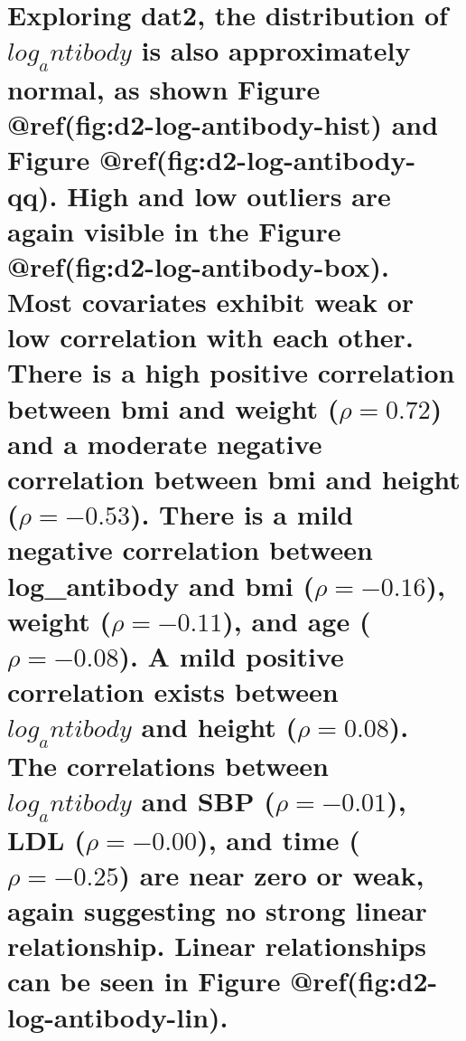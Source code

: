 \documentclass[
]{article}
\begin{document}
\section{\texorpdfstring{Exploring \textbf{dat2}, the distribution of
\textbf{$log_antibody$} is also approximately normal, as shown Figure
@ref(fig:d2-log-antibody-hist) and Figure @ref(fig:d2-log-antibody-qq).
High and low outliers are again visible in the Figure
@ref(fig:d2-log-antibody-box). Most covariates exhibit weak or low
correlation with each other. There is a high positive correlation
between \textbf{bmi} and \textbf{weight} (\(\rho = 0.72\)) and a
moderate negative correlation between \textbf{bmi} and \textbf{height}
(\(\rho = -0.53\)). There is a mild negative correlation between
\textbf{log_antibody} and \textbf{bmi} (\(\rho = -0.16\)),
\textbf{weight} (\(\rho = -0.11\)), and \textbf{age} (\(\rho = -0.08\)).
A mild positive correlation exists between \textbf{$log_antibody$} and
\textbf{height} (\(\rho = 0.08\)). The correlations between
\textbf{$log_antibody$} and \textbf{SBP} (\(\rho = -0.01\)),
\textbf{LDL} (\(\rho = -0.00\)), and \textbf{time} (\(\rho = -0.25\))
are near zero or weak, again suggesting no strong linear relationship.
Linear relationships can be seen in Figure
@ref(fig:d2-log-antibody-lin).}{Exploring , the distribution of  is also approximately normal, as shown Figure @ref(fig:d2-log-antibody-hist) and Figure @ref(fig:d2-log-antibody-qq). High and low outliers are again visible in the Figure @ref(fig:d2-log-antibody-box). Most covariates exhibit weak or low correlation with each other. There is a high positive correlation between  and  (\textbackslash rho = 0.72) and a moderate negative correlation between  and  (\textbackslash rho = -0.53). There is a mild negative correlation between  and  (\textbackslash rho = -0.16),  (\textbackslash rho = -0.11), and  (\textbackslash rho = -0.08). A mild positive correlation exists between  and  (\textbackslash rho = 0.08). The correlations between  and  (\textbackslash rho = -0.01),  (\textbackslash rho = -0.00), and  (\textbackslash rho = -0.25) are near zero or weak, again suggesting no strong linear relationship. Linear relationships can be seen in Figure @ref(fig:d2-log-antibody-lin).}}\label{exploring-the-distribution-of-is-also-approximately-normal-as-shown-figure-reffigd2-log-antibody-hist-and-figure-reffigd2-log-antibody-qq.-high-and-low-outliers-are-again-visible-in-the-figure-reffigd2-log-antibody-box.-most-covariates-exhibit-weak-or-low-correlation-with-each-other.-there-is-a-high-positive-correlation-between-and-rho-0.72-and-a-moderate-negative-correlation-between-and-rho--0.53.-there-is-a-mild-negative-correlation-between-and-rho--0.16-rho--0.11-and-rho--0.08.-a-mild-positive-correlation-exists-between-and-rho-0.08.-the-correlations-between-and-rho--0.01-rho--0.00-and-rho--0.25-are-near-zero-or-weak-again-suggesting-no-strong-linear-relationship.-linear-relationships-can-be-seen-in-figure-reffigd2-log-antibody-lin.}
\end{document}
